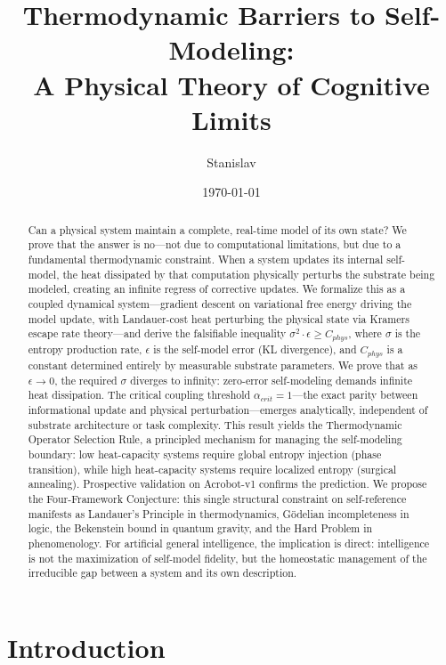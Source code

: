 \documentclass[12pt]{article}
\title{Thermodynamic Barriers to Self-Modeling:\\
A Physical Theory of Cognitive Limits}
\author{Stanislav}
\date{\today}
\begin{document}
\maketitle

\begin{abstract}
Can a physical system maintain a complete, real-time model of its own state? We prove that the answer is no---not due to computational limitations, but due to a fundamental thermodynamic constraint. When a system updates its internal self-model, the heat dissipated by that computation physically perturbs the substrate being modeled, creating an infinite regress of corrective updates. We formalize this as a coupled dynamical system---gradient descent on variational free energy driving the model update, with Landauer-cost heat perturbing the physical state via Kramers escape rate theory---and derive the falsifiable inequality $\sigma^2 \cdot \epsilon \ge C_{phys}$, where $\sigma$ is the entropy production rate, $\epsilon$ is the self-model error (KL divergence), and $C_{phys}$ is a constant determined entirely by measurable substrate parameters. We prove that as $\epsilon \to 0$, the required $\sigma$ diverges to infinity: zero-error self-modeling demands infinite heat dissipation. The critical coupling threshold $\alpha_{crit} = 1$---the exact parity between informational update and physical perturbation---emerges analytically, independent of substrate architecture or task complexity. This result yields the Thermodynamic Operator Selection Rule, a principled mechanism for managing the self-modeling boundary: low heat-capacity systems require global entropy injection (phase transition), while high heat-capacity systems require localized entropy (surgical annealing). Prospective validation on Acrobot-v1 confirms the prediction. We propose the Four-Framework Conjecture: this single structural constraint on self-reference manifests as Landauer's Principle in thermodynamics, G\"{o}delian incompleteness in logic, the Bekenstein bound in quantum gravity, and the Hard Problem in phenomenology. For artificial general intelligence, the implication is direct: intelligence is not the maximization of self-model fidelity, but the homeostatic management of the irreducible gap between a system and its own description.
\end{abstract}

\tableofcontents
\newpage

\section{Introduction}
\end{document}
